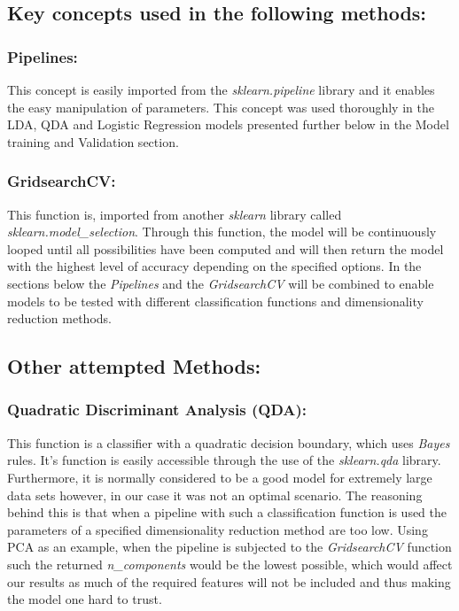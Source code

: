 \documentclass{article}
\begin{document}
\subsection{Key concepts used in the following methods:}
\label{sec:key}
\subsubsection{Pipelines:}
This concept is easily imported from the \textit{sklearn.pipeline} library and it enables the easy manipulation of parameters. This concept was used thoroughly in the LDA, QDA and Logistic Regression models presented further below in the Model training and Validation section.
\subsubsection{GridsearchCV:}
This function is, imported from another \textit{sklearn} library called \textit{sklearn.model\_selection}. Through this function, the model will be continuously looped until all possibilities have been computed and will then return the model with the highest level of accuracy depending on the specified options. In the sections below the \textit{Pipelines} and the \textit{GridsearchCV} will be combined to enable models to be tested with different classification functions and dimensionality reduction methods.

\subsection{Other attempted Methods:}
\subsubsection{Quadratic Discriminant Analysis (QDA)\cite{qda}:}
This function is a classifier with a quadratic decision boundary, which uses \textit{Bayes} rules. It’s function is easily accessible through the use of the \textit{sklearn.qda} library. Furthermore, it is normally considered to be a good model for extremely large data sets however, in our case it was not an optimal scenario. The reasoning behind this is that when a pipeline with such a classification function is used the parameters of a specified dimensionality reduction method are too low. Using PCA as an example, when the pipeline is subjected to the \textit{GridsearchCV} function such the returned \textit{n\_components} would be the lowest possible, which would affect our results as much of the required features will not be included and thus making the model one hard to trust. 
\end{document}
